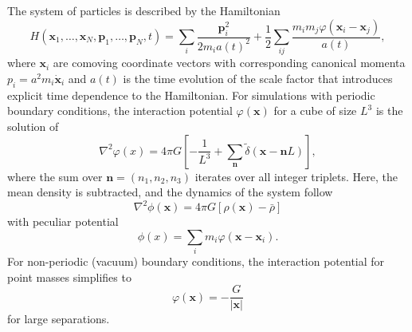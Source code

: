 The system of particles is described by the Hamiltonian
\begin{equation}
	H(\mathbf{x}_{1}, \ldots, \mathbf{x}_{N}, \mathbf{p}_{1}, \ldots, \mathbf{p}_{N}, t)
	= \sum_{i} \frac{\mathbf{p}_{i}^{2}}{2 m_{i} a(t)^{2}} + \frac{1}{2} \sum_{ij} \frac{m_{i} m_{j} \varphi(\mathbf{x}_{i} - \mathbf{x}_{j})}{a(t)},
\end{equation}
where $\mathbf{x}_{i}$ are comoving coordinate vectors with corresponding canonical momenta $p_{i} = a^{2} m_{i} \mathbf{\dot{x}}_{i}$ and $a(t)$ is the time evolution of the scale factor that introduces explicit time dependence to the Hamiltonian.  For simulations with periodic boundary conditions, the interaction potential $\varphi(\mathbf{x})$ for a cube of size $L^{3}$ is the solution of
\begin{equation} \label{eq:computational_theory--nbody_simulations--discrete_poisson}
	\nabla^{2} \varphi(x) = 4 \pi G \left[ -\frac{1}{L^{3}} + \sum_{\mathbf{n}} \tilde{\delta}(\mathbf{x} - \mathbf{n}L) \right],
\end{equation}
where the sum over $\mathbf{n} = (n_{1}, n_{2}, n_{3})$ iterates over all integer triplets.  Here, the mean density is subtracted, and the dynamics of the system follow
\begin{equation}
	\nabla^{2} \phi(\mathbf{x}) = 4 \pi G [\rho(\mathbf{x}) - \bar{\rho}]
\end{equation}
with peculiar potential
\begin{equation}
	\phi(x) = \sum_{i} m_{i} \varphi(\mathbf{x} - \mathbf{x}_{i}).
\end{equation}
For non-periodic (vacuum) boundary conditions, the interaction potential for point masses simplifies to 
\begin{equation}
	\varphi(\mathbf{x}) = -\frac{G}{|\mathbf{x}|}
\end{equation}
for large separations.

